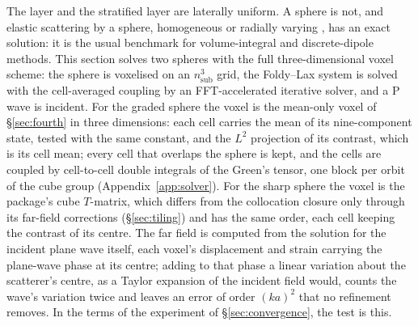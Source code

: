 \documentclass[11pt,a4paper]{article}
\begin{document}
The layer and the stratified layer are laterally uniform. A sphere is not, and elastic scattering by a
sphere, homogeneous \citep{YingTruell1956,PaoMow1973} or radially varying \citep{TakeuchiSaito1972},
has an exact solution: it is the usual benchmark for volume-integral and discrete-dipole methods. This
section solves two spheres with the full three-dimensional voxel scheme: the sphere is voxelised on an
$n_{\mathrm{sub}}^3$ grid, the Foldy--Lax system is solved with the cell-averaged coupling by an
FFT-accelerated iterative solver, and a P wave is incident. For the graded sphere the voxel is the
mean-only voxel of \S\ref{sec:fourth} in three dimensions: each cell carries the mean of its
nine-component state, tested with the same constant, and the $L^2$ projection of its contrast, which is
its cell mean; every cell that overlaps the sphere is kept, and the cells are coupled by cell-to-cell
double integrals of the Green's tensor, one block per orbit of the cube group
(Appendix~\ref{app:solver}). For the sharp sphere the voxel is the package's cube $T$-matrix, which
differs from the collocation closure only through its far-field corrections (\S\ref{sec:tiling}) and
has the same order, each cell keeping the contrast of its centre. The far field is
computed from the solution for the incident plane wave itself, each voxel's displacement and strain
carrying the plane-wave phase at its centre; adding to that phase a linear variation about the
scatterer's centre, as a Taylor expansion of the incident field would, counts the wave's variation
twice and leaves an error of order $(ka)^2$ that no refinement removes. In the terms of the experiment of \S\ref{sec:convergence}, the test is this.
\end{document}
